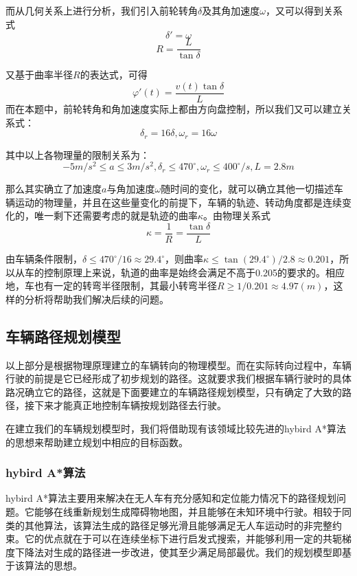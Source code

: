 \documentclass{article}
\begin{document}
    而从几何关系上进行分析，我们引入前轮转角$\delta$及其角加速度$\omega$，又可以得到关系式
    \begin{equation}
    	\delta'=\omega
    \end{equation}
	\begin{equation}
		R=\frac{L}{\tan\delta}
	\end{equation}
    
    又基于曲率半径$R$的表达式，可得
    	\begin{equation}
    	\varphi'(t)=\frac{v(t)\tan\delta}{L}
    \end{equation}
    而在本题中，前轮转角和角加速度实际上都由方向盘控制，所以我们又可以建立关系式：
	\begin{equation}
		\delta_r=16\delta,\omega_r=16\omega
	\end{equation}

    其中以上各物理量的限制关系为：
    \begin{equation}
    	-5m/s^2\leq a \leq 3m/s^2,\delta_{r} \leq 470^\circ, \omega_{r} \leq 400^\circ/s,L=2.8m
    \end{equation}

    那么其实确立了加速度$a$与角加速度$\omega$随时间的变化，就可以确立其他一切描述车辆运动的物理量，并且在这些量变化的前提下，车辆的轨迹、转动角度都是连续变化的，唯一剩下还需要考虑的就是轨迹的曲率$\kappa$。由物理关系式
	\begin{equation}
		\kappa=\frac{1}{R}=\frac{\tan\delta}{L}
	\end{equation}

    由车辆条件限制，$\delta\leq 470^\circ/16\approx 29.4^\circ$，则曲率$\kappa\leq \tan(29.4^\circ)/2.8\approx 0.201$，所以从车的控制原理上来说，轨道的曲率是始终会满足不高于0.205的要求的。相应地，车也有一定的转弯半径限制，其最小转弯半径$R\geq 1/0.201\approx4.97(m)$，这样的分析将帮助我们解决后续的问题。
    \subsection{车辆路径规划模型}
    以上部分是根据物理原理建立的车辆转向的物理模型。而在实际转向过程中，车辆行驶的前提是它已经形成了初步规划的路径。这就要求我们根据车辆行驶时的具体路况确立它的路径，这就是下面要建立的车辆路径规划模型，只有确定了大致的路径，接下来才能真正地控制车辆按规划路径去行驶。
    
    在建立我们的车辆规划模型时，我们将借助现有该领域比较先进的hybird A*算法的思想来帮助建立规划中相应的目标函数。
    
    \subsubsection{hybird A*算法}
     hybird A*算法主要用来解决在无人车有充分感知和定位能力情况下的路径规划问题。它能够在线重新规划生成障碍物地图，并且能够在未知环境中行驶。相较于同类的其他算法，该算法生成的路径足够光滑且能够满足无人车运动时的非完整约束。它的优点就在于可以在连续坐标下进行启发式搜索，并能够利用一定的共轭梯度下降法对生成的路径进一步改进，使其至少满足局部最优。我们的规划模型即基于该算法的思想。
     
\end{document}
